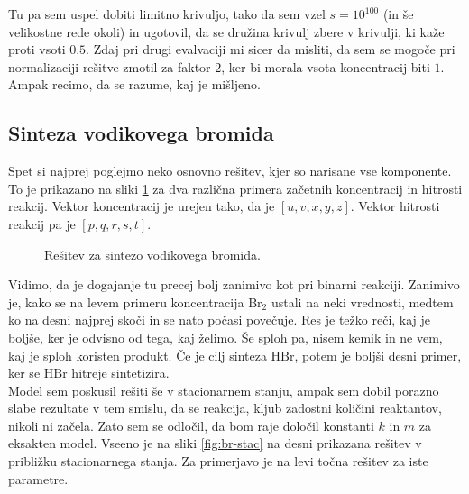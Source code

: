 \documentclass[a4paper]{article}
\begin{document}
Tu pa sem uspel dobiti limitno krivuljo, tako da sem vzel $s = 10^{100}$ (in še velikostne rede okoli) in ugotovil,
da se družina krivulj zbere v krivulji, ki kaže proti vsoti $0.5$. Zdaj pri drugi evalvaciji mi sicer da misliti, da sem
se mogoče pri normalizaciji rešitve zmotil za faktor $2$, ker bi morala vsota koncentracij biti $1$. Ampak recimo, 
da se razume, kaj je mišljeno.\\

\subsection{Sinteza vodikovega bromida}
Spet si najprej poglejmo neko osnovno rešitev, kjer so narisane vse komponente. To je prikazano na sliki 
\ref{fig:br-basic} za dva različna primera začetnih koncentracij in hitrosti reakcij. Vektor koncentracij
je urejen tako, da je $[u, v, x, y, z]$. Vektor hitrosti reakcij pa je $[p, q, r, s, t]$.

\begin{figure}[H]
    \centering
    \caption{Rešitev za sintezo vodikovega bromida.}
    \label{fig:br-basic}
\end{figure}

Vidimo, da je dogajanje tu precej bolj zanimivo kot pri binarni reakciji. Zanimivo je, kako se na levem 
primeru koncentracija $\mathrm{Br}_2$ ustali na neki vrednosti, medtem ko na desni najprej skoči in se nato 
počasi povečuje. Res je težko reči, kaj je boljše, ker je odvisno od tega, kaj želimo. Še sploh pa, nisem
kemik in ne vem, kaj je sploh koristen produkt. Če je cilj sinteza $\mathrm{HBr}$, potem je boljši desni primer,
ker se $\mathrm{HBr}$ hitreje sintetizira. \\

Model sem poskusil rešiti še v stacionarnem stanju, ampak sem dobil porazno slabe rezultate v tem smislu,
da se reakcija, kljub zadostni količini reaktantov, nikoli ni začela. Zato sem se odločil, da bom raje
določil konstanti $k$ in $m$ za eksakten model. Vseeno je na sliki \ref{fig:br-stac} na desni prikazana 
rešitev v približku stacionarnega stanja. Za primerjavo je na levi točna rešitev za iste parametre.\\
\end{document}
